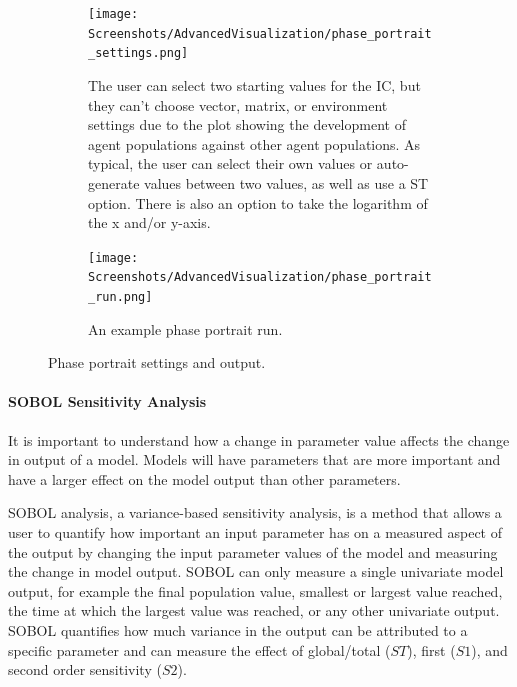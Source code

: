 \begin{figure}[h!]
    \centering
    \begin{subfigure}{0.49\linewidth}
        \centering
        \captionsetup{width=1\linewidth}
        \texttt{[image: Screenshots/AdvancedVisualization/phase\_portrait\_settings.png]}
        \caption{
            The user can select two starting values for the IC, but they can't choose vector, matrix, or environment settings due to the plot showing the development of agent populations against other agent populations.
            As typical, the user can select their own values or auto-generate values between two values, as well as use a ST option.
            There is also an option to take the logarithm of the x and/or y-axis. 
        }
        \label{fig:ss:av:phase_portrait_settings}
    \end{subfigure}
    \hfill
    \begin{subfigure}{0.49\linewidth}
        \centering
        \captionsetup{width=1\linewidth}
        \texttt{[image: Screenshots/AdvancedVisualization/phase\_portrait\_run.png]}
        \caption{
            An example phase portrait run. 
        }
        \label{fig:ss:av:phase_portrait_run}
    \end{subfigure}
    \caption{Phase portrait settings and output. }
\end{figure}

\paragraph{SOBOL Sensitivity Analysis}
\label{sec:SOBOL_sensitivity_analysis}
It is important to understand how a change in parameter value affects the change in output of a model. 
Models will have parameters that are more important and have a larger effect on the model output than other parameters. 

SOBOL analysis, a variance-based sensitivity analysis, is a method that allows a user to quantify how important an input parameter has on a measured aspect of the output by changing the input parameter values of the model and measuring the change in model output.
SOBOL can only measure a single univariate model output, for example the final population value, smallest or largest value reached, the time at which the largest value was reached, or any other univariate output. 
SOBOL quantifies how much variance in the output can be attributed to a specific parameter and can measure the effect of global/total ($ST$), first ($S1$), and second order sensitivity ($S2$). 

